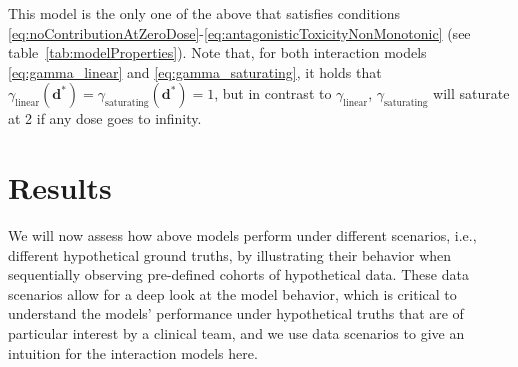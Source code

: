\documentclass[AMA,STIX1COL]{WileyNJD-v2}
\begin{document}
This model is the only one of the above that satisfies conditions \eqref{eq:noContributionAtZeroDose}-\eqref{eq:antagonisticToxicityNonMonotonic} (see table~\ref{tab:modelProperties}). Note that, for both interaction models \eqref{eq:gamma_linear} and \eqref{eq:gamma_saturating}, it holds that $\gamma_\text{linear}\left(\bm{d}^*\right) = \gamma_\text{saturating}\left(\bm{d}^*\right) = 1$, but in contrast to $\gamma_\text{linear}$, $\gamma_\text{saturating}$ will saturate at 2 if any dose goes to infinity. 




\section{Results}
We will now assess how above models perform under different scenarios, i.e., different hypothetical ground truths, by illustrating their behavior when sequentially observing pre-defined  cohorts of hypothetical data. These data scenarios allow for a deep look at the model behavior, which is critical to understand the models' performance under hypothetical truths that are of particular interest by a clinical team, and we use data scenarios to give an intuition for the interaction models here. 
\end{document}
